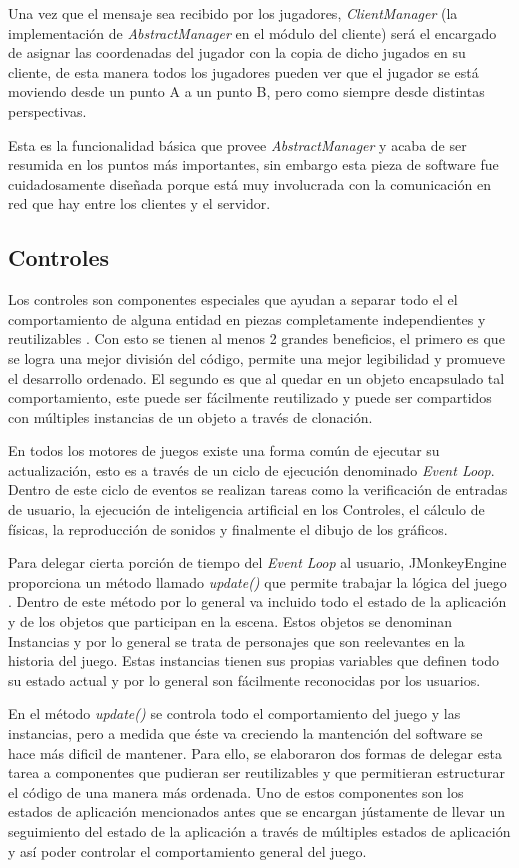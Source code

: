 \documentclass[a4paper,12pt,openany,oneside]{book}
\begin{document}
Una vez que el mensaje sea recibido por los jugadores, \textit{ClientManager} (la implementación de \textit{AbstractManager} en el módulo del cliente) será el encargado de asignar las coordenadas del jugador con la copia de dicho jugados en su cliente, de esta manera todos los jugadores pueden ver que el jugador se está moviendo desde un punto A a un punto B, pero como siempre desde distintas perspectivas.

Esta es la funcionalidad básica que provee \textit{AbstractManager} y acaba de ser resumida en los puntos más importantes, sin embargo esta pieza de software fue cuidadosamente diseñada porque está muy involucrada con la comunicación en red que hay entre los clientes y el servidor.
\subsection{Controles}
Los controles son componentes especiales que ayudan a separar todo el el comportamiento de alguna entidad en piezas completamente independientes y reutilizables \cite{BEGINNERS}. Con esto se tienen al menos 2 grandes beneficios, el primero es que se logra una mejor división del código, permite una mejor legibilidad y promueve el desarrollo ordenado. El segundo es que al quedar en un objeto encapsulado tal comportamiento, este puede ser fácilmente reutilizado y puede ser compartidos con múltiples instancias de un objeto a través de clonación.

En todos los motores de juegos existe una forma común de ejecutar su actualización, esto es a través de un ciclo de ejecución denominado \textit{Event Loop}. Dentro de este ciclo de eventos se realizan tareas como la verificación de entradas de usuario, la ejecución de inteligencia artificial en los Controles, el cálculo de físicas, la reproducción de sonidos y finalmente el dibujo de los gráficos.

Para delegar cierta porción de tiempo del \textit{Event Loop} al usuario, JMonkeyEngine proporciona un método llamado \textit{update()} que permite trabajar la lógica del juego \cite{BEGINNERS}. Dentro de este método por lo general va incluido todo el estado de la aplicación y de los objetos que participan en la escena. Estos objetos se denominan Instancias y por lo general se trata de personajes que son reelevantes en la historia del juego. Estas instancias tienen sus propias variables que definen todo su estado actual y por lo general son fácilmente reconocidas por los usuarios. 

En el método \textit{update()} se controla todo el comportamiento del juego y las instancias, pero a medida que éste va creciendo la mantención del software se hace más dificil de mantener. Para ello, se elaboraron dos formas de delegar esta tarea a componentes que pudieran ser reutilizables y que permitieran estructurar el código de una manera más ordenada. Uno de estos componentes son los estados de aplicación mencionados antes que se encargan jústamente de llevar un seguimiento del estado de la aplicación a través de múltiples estados de aplicación y así poder controlar el comportamiento general del juego.
\end{document}
